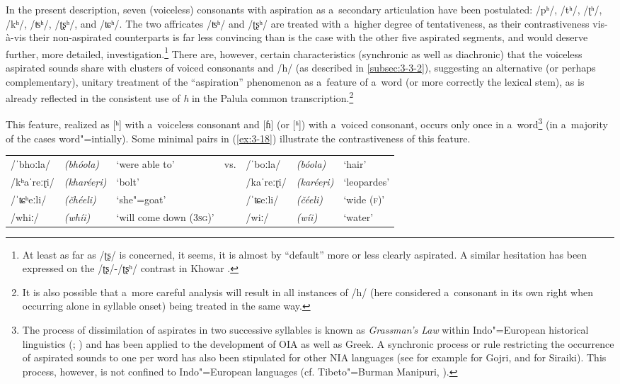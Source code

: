 In the present description, seven (voiceless) consonants with aspiration as a~secondary articulation have been postulated: /pʰ/, /tʰ/, /ʈʰ/, /kʰ/, /ʦʰ/, /ʈʂʰ/, and /ʨʰ/. The two affricates /ʦʰ/ and /ʈʂʰ/ are treated with a~higher degree of tentativeness, as their contrastiveness vis-à-vis their non-aspirated counterparts is far less convincing than is the case with the other five aspirated segments, and would deserve further, more detailed, investigation.\footnote{At least as far as /ʈʂ/ is concerned, it seems, it is almost by ``default'' more or less clearly aspirated. A similar hesitation has been expressed on the /ʈʂ/-/ʈʂʰ/ contrast in Khowar \citep[239]{endresenkristiansen1981}.} There are, however, certain characteristics (synchronic as well as diachronic) that the voiceless aspirated sounds share with clusters of voiced consonants and /h/ (as described in \ref{subsec:3-3-2}), suggesting an alternative (or perhaps complementary), unitary treatment of the ``aspiration'' phenomenon as a~feature of a~word (or more correctly the lexical stem), as is already reflected in the consistent use of \textit{h} in the Palula common transcription.\footnote{It is also possible that a~more careful analysis will result in all instances of /h/ (here considered a~consonant in its own right when occurring alone in syllable onset) being treated in the same way.} 


This feature, realized as [ʰ] with a~voiceless consonant and [ɦ] (or [ʱ]) with a~voiced consonant, occurs only once in a~word\footnote{\label{fnt:ftn32} The process of dissimilation of aspirates in two successive syllables is known as \textit{Grassman's Law} within Indo"=European historical linguistics (\citealt[19, 56]{szemerenyi1996}; \citealt[92--93]{lehmann1962}) and has been applied to the development of OIA as well as Greek. A synchronic process or rule restricting the occurrence of aspirated sounds to one per word has also been stipulated for other NIA languages (see for example \citealt[32]{losey2002} for Gojri, and \citealt[34--35]{shackle1976} for Siraiki). This process, however, is not confined to Indo"=European languages (cf. Tibeto"=Burman Manipuri, \citealt[13--14]{bhatningomba1997}).} (in a~majority of the cases word"=intially). Some minimal pairs in (\ref{ex:3-18}) illustrate the contrastiveness of this feature.


\begin{exe}
\extab
\label{ex:3-18}
\begin{tabularx}{116mm}{ l l Q l l l Q }
/ˈbhoːla/ &
\textit{(bhóola)} &
`were able to' &
vs. &
/ˈboːla/ &
\textit{(bóola)} &
`hair'\\
/kʰaˈreːɽi/ &
\textit{(kharéeṛi)} &
`bolt' &
&
/kaˈreːɽi/ &
\textit{(karéeṛi)} &
`leop\-ardes'\\
/ˈʨʰeːli/ &
\textit{(čhéeli)} &
`she"=goat' &
&
/ˈʨeːli/ &
\textit{(čéeli)} &
`wide (\textsc{f})'\\
/whiː/
&
\textit{(whíi)}
&
`will come down (\textsc{3sg})' &
&
/wiː/
&
\textit{(wíi)}
&
`water'\\
\end{tabularx}
\end{exe}


